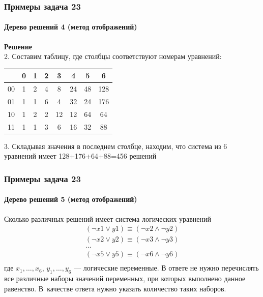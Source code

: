 \begin{frame}[t]
\frametitle{Примеры задача 23}
\framesubtitle{Дерево решений 4 (метод отображений)}

\textbf{Решение}\\
2.	Составим таблицу, где столбцы соответствуют номерам уравнений:\\
\begin{tabular}{|c|c|c|c|c|c|c|c|}
\hline 
 & 0 & 1 & 2 & 3 & 4 & 5 & 6\tabularnewline
\hline 
00 & 1 & 2 & 4 & 8 & 24 & 48 & 128\tabularnewline
\hline 
01 & 1 & 1 & 6 & 4 & 32 & 24 & 176\tabularnewline
\hline 
10 & 1 & 2 & 2 & 12 & 12 & 64 & 64\tabularnewline
\hline 
11 & 1 & 1 & 3 & 6 & 16 & 32 & 88\tabularnewline
\hline 
\end{tabular}

3. Складывая значения в последнем столбце, находим, что система из 6 уравнений имеет 128+176+64+88=456 решений
	
\end{frame}

\begin{frame}[t]
\frametitle{Примеры задача 23}
\framesubtitle{Дерево решений 5 (метод отображений)}
Сколько различных решений имеет система логических уравнений 
\begin{align*}
(\neg x1 \vee y1) \equiv (\neg x2 \wedge \neg y2)\\
(\neg x2 \vee y2) \equiv (\neg x3 \wedge \neg y3)\\
\ldots\\
(\neg x5 \vee y5) \equiv (\neg x6 \wedge \neg y6)\\
\end{align*}
где $x_1, \ldots, x_{6}$, $y_1, \ldots, y_{6}$ --- логические переменные. В ответе не нужно перечислять все различные наборы значений переменных, при которых выполнено данное равенство. В~качестве ответа нужно указать количество таких наборов.
	
\end{frame}

